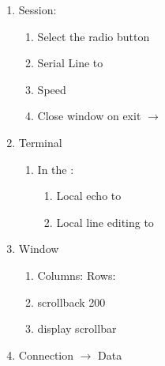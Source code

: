 \vspace{-.15cm}
\begin{enumerate}\addtolength{\itemsep}{-0.5\baselineskip}
   \item   Session:
\vspace{-.15cm}
\begin{enumerate}\addtolength{\itemsep}{-0.5\baselineskip}
   \item   Select the  radio button
   \item   Serial Line to 
   \item   Speed 
   \item   Close window on exit $\rightarrow$ 
\end{enumerate}
   \item   Terminal
\vspace{-.15cm}
\begin{enumerate}\addtolength{\itemsep}{-0.5\baselineskip}
   \item   In the :
\vspace{-.15cm}
\begin{enumerate}\addtolength{\itemsep}{-0.5\baselineskip}
   \item  Local echo to 
   \item  Local line editing to 
\end{enumerate}
\end{enumerate}
   \item   Window
\vspace{-.15cm}
\begin{enumerate}\addtolength{\itemsep}{-0.5\baselineskip}
   \item   Columns:  Rows: 
   \item   scrollback 200
   \item   display scrollbar
\end{enumerate}
   \item   Connection $\rightarrow$ Data
\vspace{-.15cm}
\begin{enumerate}\addtolength{\itemsep}{-0.5\baselineskip}

\end{enumerate}
\end{enumerate}
